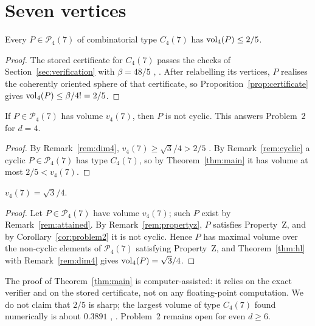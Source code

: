 \section{Seven vertices}
\label{sec:results}

\begin{theorem}
  \label{thm:main}
  Every $P \in \mathcal{P}_{4}(7)$ of combinatorial type $C_{4}(7)$ has
  $\operatorname{vol}_{4}(P) \leq 2/5$.
\end{theorem}

\begin{proof}
  The stored certificate for $C_{4}(7)$ passes the checks of
  Section~\ref{sec:verification} with $\beta = 48/5$
  , . After relabelling its
  vertices, $P$ realises the coherently oriented sphere of that certificate,
  so Proposition~\ref{prop:certificate} gives
  $\operatorname{vol}_{4}(P) \leq \beta/4! = 2/5$.
\end{proof}

\begin{corollary}
  \label{cor:problem2}
  If $P \in \mathcal{P}_{4}(7)$ has volume $v_{4}(7)$, then $P$ is not
  cyclic. This answers Problem~2 for $d = 4$.
\end{corollary}

\begin{proof}
  By Remark~\ref{rem:dim4}, $v_{4}(7) \geq \sqrt{3}/4 > 2/5$
  . By Remark~\ref{rem:cyclic} a cyclic
  $P \in \mathcal{P}_{4}(7)$ has type $C_{4}(7)$, so by
  Theorem~\ref{thm:main} it has volume at most $2/5 < v_{4}(7)$.
\end{proof}

\begin{corollary}
  \label{cor:seven}
  $v_{4}(7) = \sqrt{3}/4$.
\end{corollary}

\begin{proof}
  Let $P \in \mathcal{P}_{4}(7)$ have volume $v_{4}(7)$; such $P$ exist by
  Remark~\ref{rem:attained}. By Remark~\ref{rem:propertyz}, $P$ satisfies
  Property~Z, and by Corollary~\ref{cor:problem2} it is not cyclic. Hence $P$
  has maximal volume over the non-cyclic elements of $\mathcal{P}_{4}(7)$
  satisfying Property~Z, and Theorem~\ref{thm:hl} with
  Remark~\ref{rem:dim4} gives $\operatorname{vol}_{4}(P) = \sqrt{3}/4$.
\end{proof}

\begin{remark}
  The proof of Theorem~\ref{thm:main} is computer-assisted: it relies on the
  exact verifier  and on the stored certificate, not on any
  floating-point computation. We do not claim that $2/5$ is sharp; the
  largest volume of type $C_{4}(7)$ found numerically is about $0.3891$
  , . Problem~2 remains open for even
  $d \geq 6$.
\end{remark}
